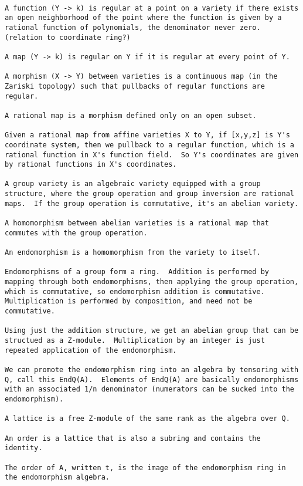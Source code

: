 \begin{verbatim}

A function (Y -> k) is regular at a point on a variety if there exists
an open neighborhood of the point where the function is given by a
rational function of polynomials, the denominator never zero.
(relation to coordinate ring?)

A map (Y -> k) is regular on Y if it is regular at every point of Y.

A morphism (X -> Y) between varieties is a continuous map (in the
Zariski topology) such that pullbacks of regular functions are
regular.

A rational map is a morphism defined only on an open subset.

Given a rational map from affine varieties X to Y, if [x,y,z] is Y's
coordinate system, then we pullback to a regular function, which is a
rational function in X's function field.  So Y's coordinates are given
by rational functions in X's coordinates.

A group variety is an algebraic variety equipped with a group
structure, where the group operation and group inversion are rational
maps.  If the group operation is commutative, it's an abelian variety.

A homomorphism between abelian varieties is a rational map that
commutes with the group operation.

An endomorphism is a homomorphism from the variety to itself.

Endomorphisms of a group form a ring.  Addition is performed by
mapping through both endomorphisms, then applying the group operation,
which is commutative, so endomorphism addition is commutative.
Multiplication is performed by composition, and need not be
commutative.

Using just the addition structure, we get an abelian group that can be
structued as a Z-module.  Multiplication by an integer is just
repeated application of the endomorphism.

We can promote the endomorphism ring into an algebra by tensoring with
Q, call this EndQ(A).  Elements of EndQ(A) are basically endomorphisms
with an associated 1/n denominator (numerators can be sucked into the
endomorphism).

A lattice is a free Z-module of the same rank as the algebra over Q.

An order is a lattice that is also a subring and contains the identity.

The order of A, written t, is the image of the endomorphism ring in
the endomorphism algebra.


\end{verbatim}
